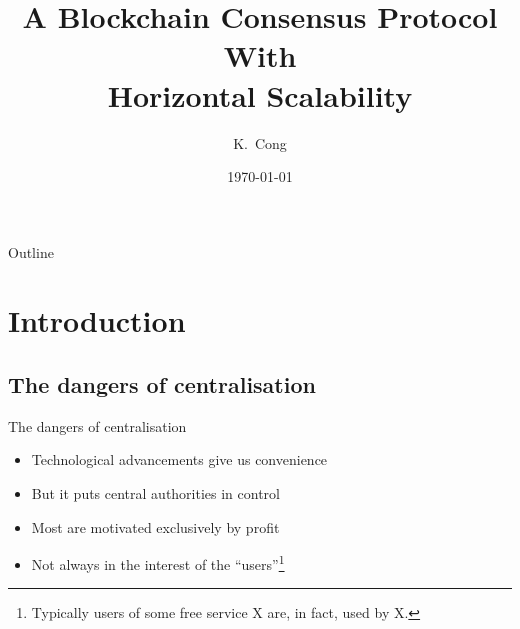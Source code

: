 \documentclass{beamer}
\title{A Blockchain Consensus Protocol With\\Horizontal Scalability}
\author{K.~Cong}
\institute[Delft University of Technology] %
{
  Faculty of Electrical Engineering, Mathematics and Computer Science\\
  Delft University of Technology}
\date{\today}
\begin{document}
\begin{frame}
  \titlepage

\end{frame}

\begin{frame}{Outline}
  \tableofcontents[]
\end{frame}

\section{Introduction}
\subsection{The dangers of centralisation}
\begin{frame}{The dangers of centralisation}
  \begin{itemize}
    \item Technological advancements give us convenience
    \item But it puts central authorities in control
    \item Most are motivated exclusively by profit
    \item Not always in the interest of the ``users''\footnote{Typically users of some free service X are, in fact, used by X.}
  \end{itemize}
\end{frame}
\end{document}
